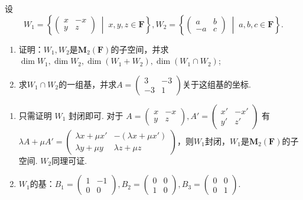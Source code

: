 \begin{exercise}
\begin{exgroup}
       \item 设\[W_1=\left\{\begin{pmatrix}
            x & -x \\ y & z
        \end{pmatrix} \;\middle|\; x,y,z\in \mathbf{F} \right\},W_2=\left\{\begin{pmatrix}
            a & b \\ -a & c
        \end{pmatrix} \;\middle|\; a,b,c\in \mathbf{F} \right\}.\]

        \begin{enumerate}
            \item 证明：$W_1,W_2$是$\mathbf{M}_2(\mathbf{F})$的子空间，并求$\dim W_1,\dim W_2,\dim(W_1+W_2),\dim(W_1\cap W_2)$;

            \item 求$W_1\cap W_2$的一组基，并求$A=\begin{pmatrix}
                        3 & -3 \\ -3 & 1
                    \end{pmatrix}$关于这组基的坐标.
        \end{enumerate}

        \begin{answer}
            \begin{enumerate}
                \item 只需证明 $W_1$ 封闭即可. 对于 $A=\begin{pmatrix}x & -x \\ y & z\end{pmatrix},A'=\begin{pmatrix} x' & -x' \\ y' & z' \end{pmatrix}$ 有 $\lambda A+\mu A'=\begin{pmatrix}
                            \lambda x+\mu x' & -(\lambda x+\mu x') \\
                            \lambda y+\mu y  & \lambda z+\mu z
                        \end{pmatrix}$，则$W_1$封闭，$W_1$是$\mathbf{M}_2(\mathbf{F})$的子空间.	$W_2$同理可证.

                \item $W_1$的基：$B_1=\begin{pmatrix}1&-1\\0&0\end{pmatrix},B_2=\begin{pmatrix}0&0\\1&0\end{pmatrix},B_3=\begin{pmatrix}0&0\\0&1\end{pmatrix}$.


\end{enumerate}
\end{answer}
\end{exgroup}
\end{exercise}
